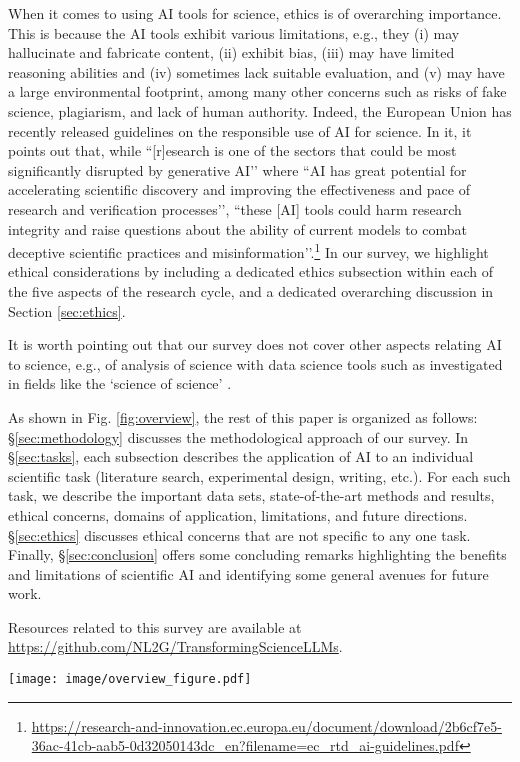 When it comes to using AI tools for science, ethics is of overarching importance. This is because the AI tools exhibit various limitations, e.g., they (i) may hallucinate and fabricate content, (ii) exhibit bias, (iii) may have limited reasoning abilities and (iv) sometimes lack suitable evaluation, and (v) may have a large environmental footprint, among many other concerns such as risks of fake science, plagiarism, and lack of human authority. Indeed, the European Union has recently released guidelines on the responsible use of AI for science. In it, it points out that, while ``[r]esearch is one of the sectors that could be most significantly disrupted by generative AI’’ where ``AI has great potential for accelerating scientific discovery and improving the effectiveness and pace of research and verification processes’’, 
``these [AI] tools could harm research integrity and raise questions about the ability of current models to combat deceptive scientific practices and misinformation’’.\footnote{\url{https://research-and-innovation.ec.europa.eu/document/download/2b6cf7e5-36ac-41cb-aab5-0d32050143dc_en?filename=ec_rtd_ai-guidelines.pdf}} In our survey, we highlight ethical considerations by including a dedicated ethics subsection within each of the five aspects of the research cycle, and a dedicated overarching discussion in Section \ref{sec:ethics}.


It is worth pointing out that our survey does not cover other aspects relating AI to science, e.g., of analysis of science with data science tools such as investigated in fields like the `science of science’ \cite{doi:10.1126/science.aao0185,wang2021science}.


As shown in Fig. \ref{fig:overview}, the rest of this paper is organized as follows: \S\ref{sec:methodology} discusses the methodological approach of our survey. In §\ref{sec:tasks}, each subsection describes the application of AI to an individual scientific task (literature search, experimental design, writing, etc.). For each such task, we describe the important data sets, state-of-the-art methods and results, ethical concerns, domains of application, limitations, and future directions. \S\ref{sec:ethics} discusses ethical concerns that are not specific to any one task.  Finally, §\ref{sec:conclusion} offers some concluding remarks highlighting the benefits and limitations of scientific AI and identifying some general avenues for future work. 

Resources related to this survey are available at \url{https://github.com/NL2G/TransformingScienceLLMs}. 


% 

\begin{figure*}[htbp]
  \centering
  \texttt{[image: image/overview\_figure.pdf]}
  \caption{Overview of the survey structure, including our survey methodology, five AI-assisted topics or tasks, and ethical considerations.} 
  \label{fig:overview}
\end{figure*}

